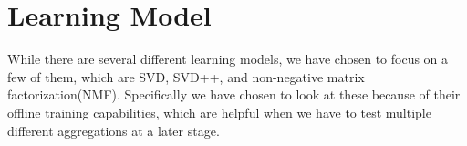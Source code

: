 \section{Learning Model}
While there are several different learning models, we have chosen to focus on a few of them, which are SVD, SVD++, and non-negative matrix factorization(NMF). Specifically we have chosen to look at these because of their offline training capabilities, which are helpful when we have to test multiple different aggregations at a later stage.
%
%



